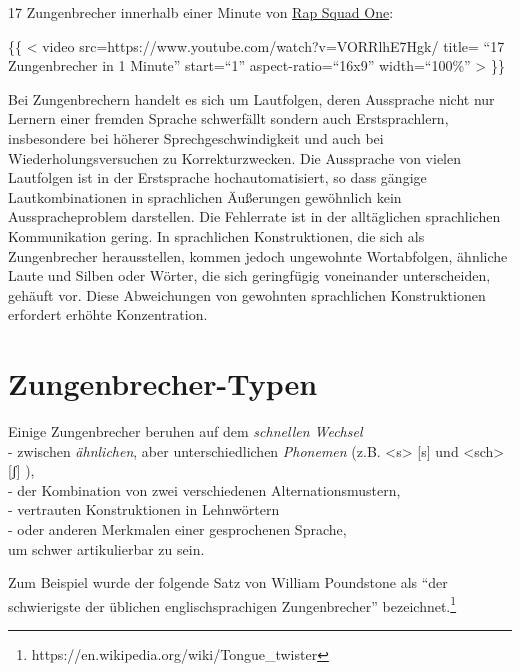 \documentclass[
  letterpaper,
]{scrbook}
\begin{document}
17 Zungenbrecher innerhalb einer Minute von
\href{https://www.youtube.com/watch?v=VORRlhE7Hgk}{Rap Squad One}:

\{\{ \textless{} video src=https://www.youtube.com/watch?v=VORRlhE7Hgk/
title= ``17 Zungenbrecher in 1 Minute'' start=``1''
aspect-ratio=``16x9'' width=``100\%'' \textgreater{} \}\}

Bei Zungenbrechern handelt es sich um Lautfolgen, deren Aussprache nicht
nur Lernern einer fremden Sprache schwerfällt sondern auch
Erstsprachlern, insbesondere bei höherer Sprechgeschwindigkeit und auch
bei Wiederholungsversuchen zu Korrekturzwecken. Die Aussprache von
vielen Lautfolgen ist in der Erstsprache hochautomatisiert, so dass
gängige Lautkombinationen in sprachlichen Äußerungen gewöhnlich kein
Ausspracheproblem darstellen. Die Fehlerrate ist in der alltäglichen
sprachlichen Kommunikation gering. In sprachlichen Konstruktionen, die
sich als Zungenbrecher herausstellen, kommen jedoch ungewohnte
Wortabfolgen, ähnliche Laute und Silben oder Wörter, die sich
geringfügig voneinander unterscheiden, gehäuft vor. Diese Abweichungen
von gewohnten sprachlichen Konstruktionen erfordert erhöhte
Konzentration.

\hypertarget{zungenbrecher-typen}{%
\section{Zungenbrecher-Typen}\label{zungenbrecher-typen}}

Einige Zungenbrecher beruhen auf dem \emph{schnellen Wechsel}\\
- zwischen \emph{ähnlichen}, aber unterschiedlichen \emph{Phonemen}
(z.B. \textless s\textgreater{} {[}s{]} und \textless sch\textgreater{}
{[}ʃ{]} ),\\
- der Kombination von zwei verschiedenen Alternationsmustern,\\
- vertrauten Konstruktionen in Lehnwörtern\\
- oder anderen Merkmalen einer gesprochenen Sprache,\\
um schwer artikulierbar zu sein.

Zum Beispiel wurde der folgende Satz von William Poundstone als ``der
schwierigste der üblichen englischsprachigen Zungenbrecher''
bezeichnet.\footnote{https://en.wikipedia.org/wiki/Tongue\_twister}
\end{document}
